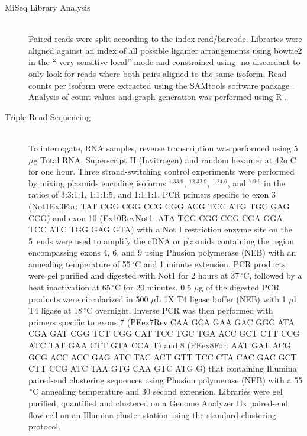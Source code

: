 \begin{description}
		\item[MiSeq Library Analysis] \hfill \\
		Paired reads were split according to the index read/barcode. Libraries were aligned against an index of all possible \dscam{} ligamer arrangements using bowtie2 \citep{Langmead2012} in the ``-very-sensitive-local'' mode and constrained using -no-discordant to only look for reads where both pairs aligned to the same isoform. Read counts per isoform were extracted using the SAMtools software package \citep{Li2009d}. Analysis of count values and graph generation was performed using R \citep{RDevelopmentCoreTeam2011}.
		
		\item[Triple Read Sequencing] \hfill \\
		To interrogate, RNA samples, reverse transcription was performed using 5 $\mu$g Total RNA, Superscript II (Invitrogen) and random hexamer at 42o C for one hour. Three strand-switching control experiments were performed by mixing plasmids encoding isoforms \dscam{}$^{1.33.9}$, \dscam{}$^{12.32.9}$, \dscam{}$^{1.24.6}$, and \dscam{}$^{7.9.6}$ in the ratios of 3:3:1:1, 1:1:1:5, and 1:1:1:1. PCR primers specific to exon 3 (Not1Ex3For: TAT CGG CGG CCG CGG ACG TCC ATG TGC GAG CCG) and exon 10 (Ex10RevNot1: ATA TCG CGG CCG CGA GGA TCC ATC TGG GAG GTA) with a Not I restriction enzyme site on the 5\textprime~ends were used to amplify the cDNA or plasmids containing the region encompassing exons 4, 6, and 9 using Phusion polymerase (NEB) with an annealing temperature of 55$\,^{\circ}\mathrm{C}$ and 1 minute extension. PCR products were gel purified and digested with Not1 for 2 hours at 37$\,^{\circ}\mathrm{C}$, followed by a heat inactivation at 65$\,^{\circ}\mathrm{C}$ for 20 minutes. 0.5 $\mu$g of the digested PCR products were circularized in 500 $\mu$L 1X T4 ligase buffer (NEB) with 1 $\mu$l T4 ligase at 18$\,^{\circ}\mathrm{C}$ overnight. Inverse PCR was then performed with primers specific to exons 7 (PEex7Rev:CAA GCA GAA GAC GGC ATA CGA GAT CGG TCT CGG CAT TCC TGC TGA ACC GCT CTT CCG ATC TAT GAA CTT GTA CCA T) and 8 (PEex8For: AAT GAT ACG GCG ACC ACC GAG ATC TAC ACT GTT TCC CTA CAC GAC GCT CTT CCG ATC TAA GTG CAA GTC ATG G) that containing Illumina paired-end clustering sequences using Phusion polymerase (NEB) with a 55$\,^{\circ}\mathrm{C}$ annealing temperature and 30 second extension. Libraries were gel purified, quantified and clustered on a Genome Analyzer IIx paired-end flow cell on an Illumina cluster station using the standard clustering protocol.


\end{description}
